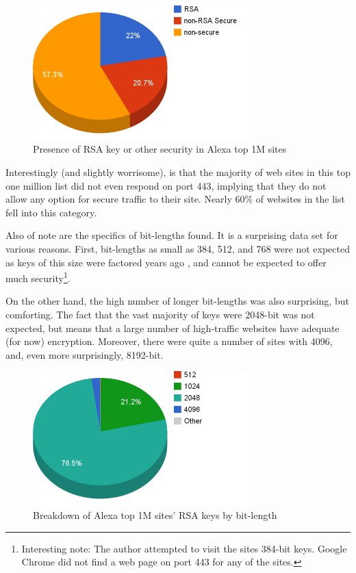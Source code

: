 \documentclass{acm_proc_article-sp}
\begin{document}
\begin{figure}
   \includegraphics[width=3.3in]{cert_security.png}
   \caption{Presence of RSA key or other security in Alexa top 1M sites}
   \label{fig:certs}
\end{figure}

Interestingly (and slightly worrisome), is that the majority of web sites in
this top one million list did not even respond on port 443, implying that
they do not allow any option for secure traffic to their site. Nearly 60\% of
websites in the list fell into this category.

Also of note are the specifics of bit-lengths found. It is a surprising data
set for various reasons. First, bit-lengths as small as 384, 512, and 768 were
not expected as keys of this size were factored years ago
\cite{rsa2007challenge}, and cannot be expected to offer much
security\footnote{Interesting note: The author attempted to visit the sites
384-bit keys. Google Chrome did not find a web page on port 443 for any of
the sites.}.

On the other hand, the high number of longer bit-lengths was also surprising,
but comforting. The fact that the vast majority of keys were 2048-bit was not
expected, but means that a large number of high-traffic websites have adequate
(for now) encryption. Moreover, there were quite a number of sites with 4096,
and, even more surprisingly, 8192-bit.

\begin{figure}
   \includegraphics[width=3.3in]{bit_length.png}
   \caption{Breakdown of Alexa top 1M sites' RSA keys by bit-length}
   \label{fig:bits}
\end{figure}
\end{document}
